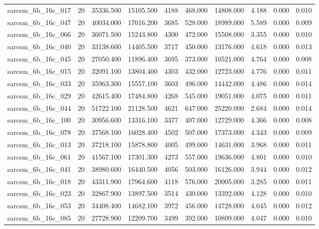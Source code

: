 \begin{tabular}{lrrrrrrrrr}
sarcsm\_6b\_16c\_017 & 20 & 35336.500 & 15105.500 & 4188 & 468.000 & 14808.000 & 4.188 & 0.000 & 0.010 \\
sarcsm\_6b\_16c\_047 & 20 & 40034.000 & 17016.200 & 3685 & 528.000 & 18989.000 & 5.589 & 0.000 & 0.009 \\
sarcsm\_6b\_16c\_066 & 20 & 36071.500 & 15243.800 & 4300 & 472.000 & 15508.000 & 3.355 & 0.000 & 0.010 \\
sarcsm\_6b\_16c\_040 & 20 & 33138.600 & 14405.500 & 3717 & 450.000 & 13176.000 & 4.618 & 0.000 & 0.013 \\
sarcsm\_6b\_16c\_045 & 20 & 27050.400 & 11896.400 & 3695 & 373.000 & 10521.000 & 4.764 & 0.000 & 0.008 \\
sarcsm\_6b\_16c\_015 & 20 & 32091.100 & 13804.400 & 4303 & 432.000 & 12723.000 & 4.776 & 0.000 & 0.011 \\
sarcsm\_6b\_16c\_033 & 20 & 35963.300 & 15557.100 & 3603 & 496.000 & 14442.000 & 4.486 & 0.000 & 0.014 \\
sarcsm\_6b\_16c\_029 & 20 & 42615.400 & 17484.800 & 4268 & 545.000 & 19051.000 & 4.075 & 0.000 & 0.011 \\
sarcsm\_6b\_16c\_044 & 20 & 51722.100 & 21128.500 & 4621 & 647.000 & 25220.000 & 2.684 & 0.000 & 0.014 \\
sarcsm\_6b\_16c\_100 & 20 & 30956.600 & 13316.100 & 3377 & 407.000 & 12729.000 & 4.366 & 0.000 & 0.008 \\
sarcsm\_6b\_16c\_078 & 20 & 37568.100 & 16028.400 & 4502 & 507.000 & 17373.000 & 4.343 & 0.000 & 0.009 \\
sarcsm\_6b\_16c\_013 & 20 & 37218.100 & 15878.800 & 4005 & 499.000 & 14631.000 & 3.968 & 0.000 & 0.011 \\
sarcsm\_6b\_16c\_061 & 20 & 41567.100 & 17301.300 & 4273 & 557.000 & 19636.000 & 4.801 & 0.000 & 0.010 \\
sarcsm\_6b\_16c\_041 & 20 & 38980.600 & 16440.500 & 4056 & 503.000 & 16126.000 & 3.944 & 0.000 & 0.012 \\
sarcsm\_6b\_16c\_018 & 20 & 43311.900 & 17964.600 & 4118 & 576.000 & 20005.000 & 3.285 & 0.000 & 0.011 \\
sarcsm\_6b\_16c\_023 & 20 & 32867.900 & 13897.500 & 3514 & 430.000 & 13392.000 & 4.128 & 0.000 & 0.010 \\
sarcsm\_6b\_16c\_053 & 20 & 34408.400 & 14682.100 & 3972 & 456.000 & 14728.000 & 4.045 & 0.000 & 0.012 \\
sarcsm\_6b\_16c\_085 & 20 & 27728.900 & 12209.700 & 3499 & 392.000 & 10809.000 & 4.047 & 0.000 & 0.010 \\

\end{tabular}
